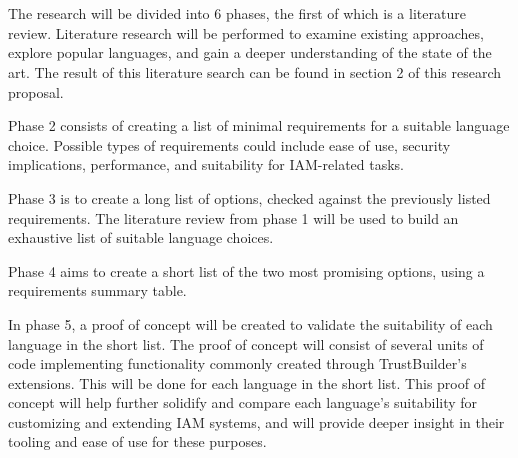 
\chapter{}%
\label{ch:methodologie}


The research will be divided into 6 phases, the first of which is a literature review. Literature research will be performed to examine existing approaches, explore popular languages, and gain a deeper understanding of the state of the art. The result of this literature search can be found in section 2 of this research proposal.

Phase 2 consists of creating a list of minimal requirements for a suitable language choice. Possible types of requirements could include ease of use, security implications, performance, and suitability for IAM-related tasks.

Phase 3 is to create a long list of options, checked against the previously listed requirements. The literature review from phase 1 will be used to build an exhaustive list of suitable language choices.

Phase 4 aims to create a short list of the two most promising options, using a requirements summary table.

In phase 5, a proof of concept will be created to validate the suitability of each language in the short list. The proof of concept will consist of several units of code implementing functionality commonly created through TrustBuilder's extensions. This will be done for each language in the short list. This proof of concept will help further solidify and compare each language's suitability for customizing and extending IAM systems, and will provide deeper insight in their tooling and ease of use for these purposes.


